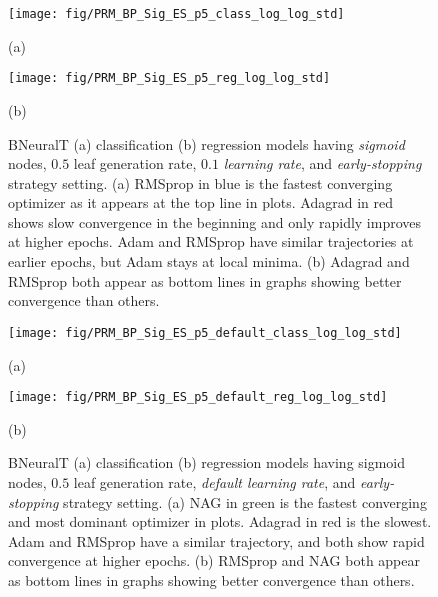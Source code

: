 \documentclass[11pt,a4paper]{article}
\begin{document}
\begin{figure}
        \centering
        \texttt{[image: fig/PRM\_BP\_Sig\_ES\_p5\_class\_log\_log\_std]}


        (a)
        
        \centering
        \texttt{[image: fig/PRM\_BP\_Sig\_ES\_p5\_reg\_log\_log\_std]}
        
        (b)
        \caption{BNeuralT (a) classification (b) regression models having \textit{sigmoid} nodes, $0.5$ leaf generation rate, $0.1$ \textit{learning rate}, and \textit{early-stopping} strategy setting.
        (a) RMSprop in blue is the fastest converging optimizer as it appears at the top line in plots. Adagrad in red shows slow convergence in the beginning and only rapidly improves at higher epochs. Adam and RMSprop have similar trajectories at earlier epochs, but Adam stays at local minima. (b) Adagrad and RMSprop both appear as bottom lines in graphs showing better convergence than others.  
\label{fig:PRM_BP_Sig_ES_p5}}
    \end{figure}
    
\begin{figure}
        \centering
        \texttt{[image: fig/PRM\_BP\_Sig\_ES\_p5\_default\_class\_log\_log\_std]}
        
        (a)


        \centering
        \texttt{[image: fig/PRM\_BP\_Sig\_ES\_p5\_default\_reg\_log\_log\_std]}
        
        (b)
        \caption{BNeuralT (a) classification (b) regression models having sigmoid nodes, $0.5$ leaf generation rate, \textit{default learning rate}, and \textit{early-stopping} strategy setting.
        (a) NAG in green is the fastest converging and most dominant  optimizer in plots. Adagrad in red is the slowest. Adam and RMSprop have a similar trajectory, and both show rapid convergence at higher epochs. (b) RMSprop and NAG both appear as bottom lines in graphs showing better convergence than others. 
\label{fig:PRM_BP_Sig_ES_p5_default}}
    \end{figure}
    
\end{document}
